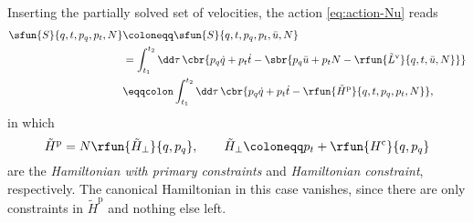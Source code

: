 \documentclass[a4paper]{article}
\begin{document}
Inserting the partially solved set of velocities, the action
\cref{eq:action-Nu} reads
\begin{align}
\sfun{S}{q, t, p_q, p_t, N} &\coloneqq \sfun{S}{q, t, p_q, p_t, \bar 
u, N} \nonumber \\
&= \int_{t_1}^{t_2}\dd \tau\,\cbr{p_q \dot q + p_t \dot t - \sbr{ p_q \bar u + 
p_t N - \rfun{\tilde L^\text{v}}{q, t, \bar u, N}}} \nonumber \\
& \eqqcolon \int_{t_1}^{t_2}\dd \tau\,
\cbr{p_q \dot q + p_t\dot t - \rfun{\tilde H^\text{p}}{q, t, p_q, p_t, N}},
\end{align}
in which
\begin{equation}
\tilde H^\text{p} = N \rfun{\tilde H_\perp}{q, p_q},\qquad
\tilde H_\perp \coloneqq p_t + \rfun{H^\text{c}}{q, p_q}
\end{equation}
are the \emph{Hamiltonian with primary constraints} and \emph{Hamiltonian 
constraint}, respectively. The canonical Hamiltonian in this case vanishes, 
since there are only constraints in $\tilde H^\text{p}$ and nothing else left.






\printbibliography
\end{document}
